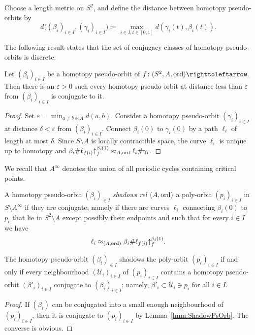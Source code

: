 \documentclass{amsart}
\begin{document}
Choose a length metric on $S^2$, and define the distance between homotopy
pseudo-orbits by
\begin{equation}
  d\big((\beta_i)_{i\in I},(\gamma_i)_{i\in I}\big)\coloneqq\max_{i\in I,t\in[0,1]} d(\gamma_i(t),\beta_i(t)).
\end{equation}

The following result states that the set of conjugacy classes of
homotopy pseudo-orbits is discrete:
\begin{lem}[Discreteness]\label{lmm:ShadowPsOrb}
  Let $(\beta_i)_{i\in I}$ be a homotopy pseudo-orbit of
  $f\colon(S^2,A,\ord)\selfmap$. Then there is an $\varepsilon> 0$
  such every homotopy pseudo-orbit at distance less than $\varepsilon$
  from $(\beta_i)_{i\in I}$ is conjugate to it.
\end{lem}
\begin{proof}
  Set $\varepsilon=\min_{a\neq b\in A}d(a,b)$. Consider a homotopy
  pseudo-orbit $(\gamma_i)_{i\in I}$ at distance $\delta<\varepsilon$
  from $(\beta_i)_{i\in I}$. Connect $\beta_i(0)$ to $\gamma_i(0)$ by
  a path $\ell_i$ of length at most $\delta$. Since $S\setminus A$ is
  locally contractible space, the curve $\ell_i$ is unique up to
  homotopy and
  $\beta_i\#\ell_{f(i)}{\uparrow}_{f}^{\beta_i(1)}\approx_{A,\operatorname{ord}}\ell_i\#\gamma_i$.
\end{proof}

We recall that $A^{\infty}$ denotes the union of all periodic cycles
containing critical points.
\begin{defn}[Shadowing]
\label{defn:Shadowing}
  A homotopy pseudo-orbit $(\beta_i)_{\in I}$ \emph{shadows rel
    $(A,\operatorname{ord})$} a poly-orbit $(p_i)_{i\in I}$ in
  $S\setminus A^{\infty}$ if they are conjugate; namely if there are
  curves $\ell_i$ connecting $\beta_i(0)$ to $p_i$ that lie in
  $S^2\setminus A$ except possibly their endpoints and such that for
  every $i\in I$ we have
  \[\ell_i\approx_{(A,\operatorname{ord})} \beta_i\#\ell_{f(i)}{\uparrow}_{f}^{\beta_i(1)}.\qedhere\]
\end{defn}

\begin{lem}
  The homotopy pseudo-orbit $(\beta_i)_{\in I}$ shadows the poly-orbit
  $(p_i)_{i\in I}$ if and only if every neighbourhood
  $(\mathcal U_i)_{i\in I}$ of $(p_i)_{i\in I}$ contains a homotopy
  pseudo-orbit $(\beta'_i)_{i\in I}$ conjugate to
  $(\beta_i)_{i\in I}$; namely, $\beta'_i\subset\mathcal U_i\ni p_i$
  for all $i\in I$.
\end{lem}
\begin{proof}
  If $(\beta_i)$ can be conjugated into a small enough neighbourhood
  of $(p_i)_{i\in I}$, then it is conjugate to $(p_i)_{i\in I}$ by
  Lemma~\ref{lmm:ShadowPsOrb}. The converse is obvious.
\end{proof}
\end{document}
